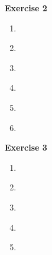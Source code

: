 \documentclass{article}
\begin{document}
\textbf{Exercise 2}\vspace{.25cm}

\begin{enumerate}[label=\alph*)]
\item ~\\\vspace{5cm}
\item ~\\\vspace{5cm}
\item ~\\\vspace{5cm}
\item ~\\\vspace{5cm}
\item ~\\\vspace{5cm}
\item ~\\\vspace{5cm}
\end{enumerate}

\textbf{Exercise 3}\vspace{.25cm}

\begin{enumerate}[label=\alph*)]
\item ~\\\vspace{5cm}
\item ~\\\vspace{5cm}
\item ~\\\vspace{5cm}
\item ~\\\vspace{5cm}
\item ~\\\vspace{5cm}
\end{enumerate}
\end{document}
